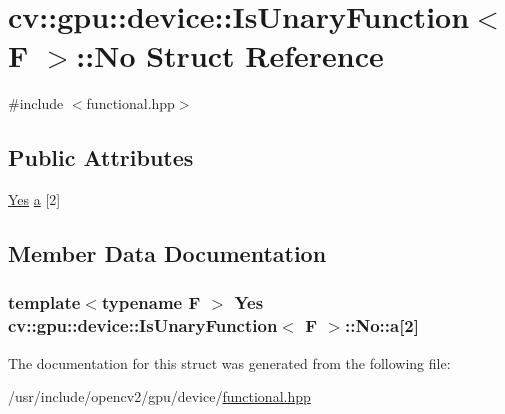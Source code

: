 \hypertarget{structcv_1_1gpu_1_1device_1_1IsUnaryFunction_1_1No}{\section{cv\-:\-:gpu\-:\-:device\-:\-:Is\-Unary\-Function$<$ F $>$\-:\-:No Struct Reference}
\label{structcv_1_1gpu_1_1device_1_1IsUnaryFunction_1_1No}
}


{\ttfamily \#include $<$functional.\-hpp$>$}

\subsection*{Public Attributes}
\begin{DoxyCompactItemize}
\item 
\hyperlink{structcv_1_1gpu_1_1device_1_1IsUnaryFunction_af3211ec0f917bee79645b078a0760c7e}{Yes} \hyperlink{structcv_1_1gpu_1_1device_1_1IsUnaryFunction_1_1No_a60164b0d7eee512e1437078470dd2f09}{a} \mbox{[}2\mbox{]}
\end{DoxyCompactItemize}


\subsection{Member Data Documentation}
\hypertarget{structcv_1_1gpu_1_1device_1_1IsUnaryFunction_1_1No_a60164b0d7eee512e1437078470dd2f09}{
\subsubsection[{a}]{\setlength{\rightskip}{0pt plus 5cm}template$<$typename F $>$ {\bf Yes} {\bf cv\-::gpu\-::device\-::\-Is\-Unary\-Function}$<$ {\bf F} $>$\-::No\-::a\mbox{[}2\mbox{]}}}\label{structcv_1_1gpu_1_1device_1_1IsUnaryFunction_1_1No_a60164b0d7eee512e1437078470dd2f09}


The documentation for this struct was generated from the following file\-:\begin{DoxyCompactItemize}
\item 
/usr/include/opencv2/gpu/device/\hyperlink{functional_8hpp}{functional.\-hpp}\end{DoxyCompactItemize}

